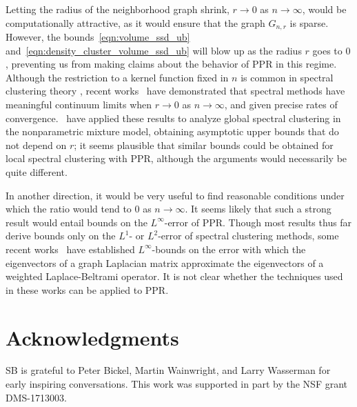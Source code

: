 \documentclass[11pt,twoside]{article}
\newcommand{\1}{\mathbf{1}}
\newcommand{\Leb}{L}
\newcommand{\mc}[1]{\mathcal{#1}}
\newcommand{\wh}[1]{\widehat{#1}}
\newcommand{\vol}{\mathrm{vol}}
\begin{document}
Letting the radius of the neighborhood graph shrink, $r \to 0$ as $n \to \infty$, would be computationally attractive, as it would ensure that the graph $G_{n,r}$ is sparse. However, the bounds~\eqref{eqn:volume_ssd_ub} and~\eqref{eqn:density_cluster_volume_ssd_ub} will blow up as the radius $r$ goes to $0$, preventing us from making claims about the behavior of PPR in this regime. Although the restriction to a kernel function fixed in $n$ is common in spectral clustering theory \citep{vonluxburg2008, schiebinger2015, singer2017}, recent works~\citep{shi2015, calder2019, garciatrillos18, garciatrillos2020, yuan2020} have demonstrated that spectral methods have meaningful continuum limits when $r \to 0$ as $n \to \infty$, and given precise rates of convergence.~\cite{garciatrillos19} have applied these results to analyze global spectral clustering in the nonparametric mixture model, obtaining asymptotic upper bounds that do not depend on $r$; it seems plausible that similar bounds could be obtained for local spectral clustering with PPR, although the arguments would necessarily be quite different.

In another direction, it would be very useful to find reasonable conditions under which the ratio \smash{$\Delta(\wh{C},\mc{C}[X])/\vol_{n,r}(\mc{C}[X])$} would tend to $0$ as $n \to \infty$. It seems likely that such a strong result would entail bounds on the $\Leb^{\infty}$-error of PPR. Though most results thus far derive bounds only on the $\Leb^1$- or $\Leb^2$-error of spectral clustering methods, some recent works~\citep{dunson2020,calder2020} have established $\Leb^{\infty}$-bounds on the error with which the eigenvectors of a graph Laplacian matrix approximate the eigenvectors of a weighted Laplace-Beltrami operator. It is not clear whether the techniques used in these works can be applied to PPR.

\section*{Acknowledgments}

SB is grateful to Peter Bickel, Martin Wainwright, and Larry Wasserman for early inspiring conversations. This work was supported in part by the NSF grant DMS-1713003.

 

\clearpage

\appendix

\end{document}
